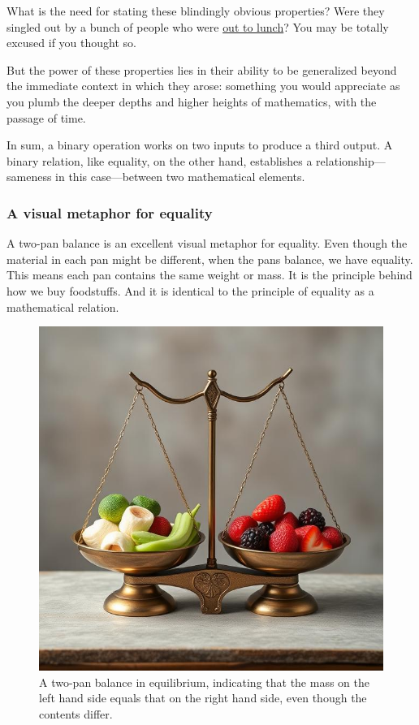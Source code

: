 \documentclass[
  a4paper,
]{article}
\begin{document}
What is the need for stating these blindingly obvious properties? Were
they singled out by a bunch of people who were
\href{https://www.dictionary.com/browse/out-to-lunch}{out to lunch}? You
may be totally excused if you thought so.

But the power of these properties lies in their ability to be
generalized beyond the immediate context in which they arose: something
you would appreciate as you plumb the deeper depths and higher heights
of mathematics, with the passage of time.

In sum, a binary operation works on two inputs to produce a third
output. A binary relation, like equality, on the other hand, establishes
a relationship---sameness in this case---between two mathematical
elements.

\subsubsection{A visual metaphor for
equality}\label{a-visual-metaphor-for-equality}

A two-pan balance is an excellent visual metaphor for equality. Even
though the material in each pan might be different, when the pans
balance, we have equality. This means each pan contains the same weight
or mass. It is the principle behind how we buy foodstuffs. And it is
identical to the principle of equality as a mathematical relation.

\begin{figure}
\centering
\includegraphics[width=0.9\linewidth,height=\textheight,keepaspectratio]{images/two-pan-balance-in-equilibrium.jpg}
\caption{A two-pan balance in equilibrium, indicating that the mass on
the left hand side equals that on the right hand side, even though the
contents differ.}\label{fig:two-pan-balance}
\end{figure}
\end{document}
